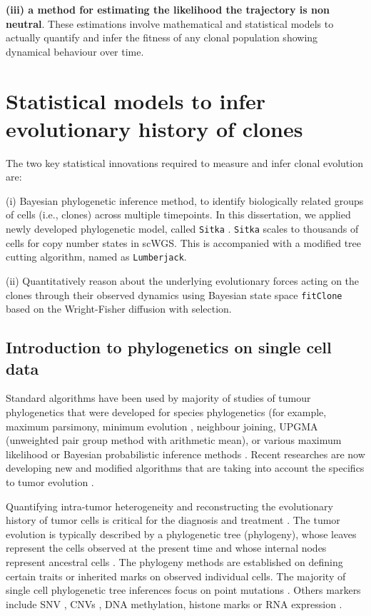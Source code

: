 \textbf{(iii) a method for estimating the likelihood the trajectory is non neutral}.
These estimations involve mathematical and statistical models to actually quantify and infer the fitness of any clonal population showing dynamical behaviour over time.


\section{Statistical models to infer evolutionary history of clones}
The two key statistical innovations required to measure and infer clonal evolution are: 
 
 (i) Bayesian phylogenetic inference method, to identify biologically related groups of cells (i.e., clones) across multiple timepoints. 
 In this dissertation, we applied newly developed phylogenetic model, called \texttt{Sitka} \cite{dorri2020efficient}. \texttt{Sitka} scales to thousands of cells for copy number states in scWGS. This is accompanied with a modified tree cutting algorithm, named as \texttt{Lumberjack}.

(ii) Quantitatively reason about the underlying evolutionary
forces acting on the clones through their observed dynamics
 using Bayesian state space \texttt{fitClone}  based on the Wright-Fisher diffusion with selection.
 

\subsection{Introduction to phylogenetics on single cell data}
Standard algorithms have been used by majority of studies of tumour phylogenetics that were developed for species phylogenetics (for example, maximum parsimony, minimum evolution , neighbour joining,  UPGMA (unweighted pair group method with arithmetic mean), or various maximum likelihood or Bayesian probabilistic inference methods \cite{de2014spatial, zhang2014intratumor, brocks2014intratumor, navin2011tumour, xu2012single, huelsenbeck2001bayesian, felsenstein2004inferring}. Recent researches are now developing new and modified algorithms that are taking into account the specifics to tumor evolution \cite{chowdhury2013phylogenetic, yuan2015bitphylogeny, jahn2016tree}.

Quantifying intra-tumor heterogeneity and reconstructing the evolutionary history of tumor cells is critical for the diagnosis and treatment \cite{burrell2013causes, tabassum2015tumorigenesis}. The tumor evolution  is typically described by a phylogenetic tree (phylogeny), whose leaves represent the cells observed at the present time and whose internal nodes represent ancestral cells \cite{satas2020scarlet}.
The phylogeny methods are established on defining certain traits or inherited marks on observed individual cells. The majority of single cell phylogenetic tree inferences focus on point mutations \cite{singer2018single, zafar2017sifit, schwartz2017evolution}. Others markers include \ac{SNV} \cite{bashashati2013distinct}, \ac{CNVs} \cite{navin2011tumour},  DNA methylation, histone marks or RNA expression \cite {brocks2014intratumor, yates2012evolution, greaves2012clonal}.


